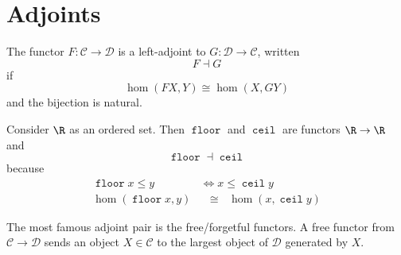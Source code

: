 \documentclass[a5paper]{scrartcl}
\def\cat{\mathcal{C}}
\def\dee{\mathcal{D}}
\DeclareMathOperator{\floor}{\texttt{floor}}
\DeclareMathOperator{\ceil}{\texttt{ceil}}
\DeclareMathOperator*{\Hom}{hom}
\begin{document}
\section{Adjoints}
\begin{defn}[Adjoint]
  The functor \(F: \cat \to \dee\) is a left-adjoint to \(G: \dee \to \cat\), written
  \[
    F \dashv G
  \]
  if
  \[
    \Hom(FX, Y) \cong \Hom(X, GY)
  \]
  and the bijection is natural.
\end{defn}
Consider \(\R\) as an ordered set. Then \(\floor\) and \(\ceil\) are functors \(\R\to \R\) and
\[
  \floor \dashv \ceil
\]
because
\begin{align*}
  \floor x \leq y &\iff x \leq \ceil y\\
  \Hom(\floor x,y) &\phantom{n}\cong\phantom{n} \Hom(x,\ceil y)
\end{align*}

The most famous adjoint pair is the free/forgetful functors.
A free functor from \(\cat \to \dee\) sends an object \(X\in \cat\) to the largest object of \(\dee\) generated by \(X\).
\end{document}
